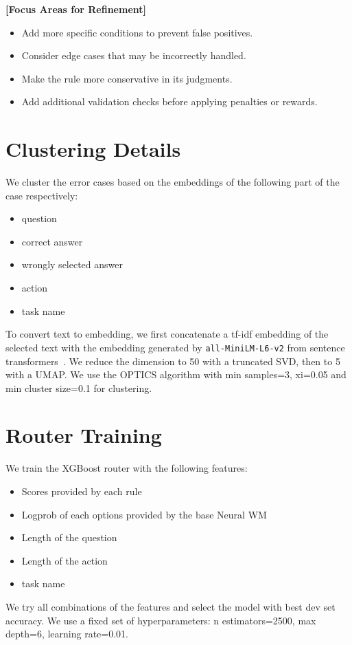 \documentclass{article}
\theoremstyle{plain}
\theoremstyle{definition}
\theoremstyle{remark}
\begin{document}
\begin{tcolorbox}[
  title=Prompt for reflection in rule induction,
  colback=gray!5,
  colframe=black!50,
  fonttitle=\bfseries,
  breakable
]
\textbf{[Focus Areas for Refinement]}
\begin{itemize}
  \item Add more specific conditions to prevent false positives.
  \item Consider edge cases that may be incorrectly handled.
  \item Make the rule more conservative in its judgments.
  \item Add additional validation checks before applying penalties or rewards.
\end{itemize}
\end{tcolorbox}

\section{Clustering Details}\label{app:clustering}
We cluster the error cases based on the embeddings of the following part of the case respectively:
\begin{itemize}
    \item question
    \item correct answer
    \item wrongly selected answer
    \item action
    \item task name
\end{itemize}
To convert text to embedding, we first concatenate a tf-idf embedding of the selected text with the embedding generated by \texttt{all-MiniLM-L6-v2} from sentence transformers~\citep{reimers-2019-sentence-bert}. We reduce the dimension to 50 with a truncated SVD, then to 5 with a UMAP. We use the OPTICS algorithm with min samples=3, xi=0.05 and min cluster size=0.1 for clustering. 

\section{Router Training}\label{app:router}
We train the XGBoost router with the following features:
\begin{itemize}
    \item Scores provided by each rule
    \item Logprob of each options provided by the base Neural WM
    \item Length of the question
    \item Length of the action
    \item task name
\end{itemize}
We try all combinations of the features and select the model with best dev set accuracy. We use a fixed set of hyperparameters: n estimators=2500, max depth=6, learning rate=0.01.
\end{document}
